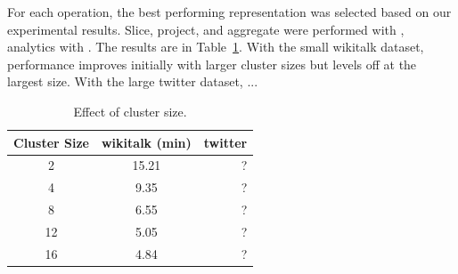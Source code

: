For each operation, the best performing representation was selected
based on our experimental results.  Slice, project, and aggregate were
performed with \ve, analytics with \hg.  The results are in
Table~\ref{tab:clustersize}.  With the small wikitalk dataset,
performance improves initially with larger cluster sizes but levels
off at the largest size.  With the large twitter dataset, ...

\begin{table}
\caption{Effect of cluster size.}
\small
\begin{tabular}{| c | c | r |}
\hline
\multicolumn{1}{|c|}{\bfseries Cluster Size} & \multicolumn{1}{c|}{\bfseries wikitalk (min)} & \multicolumn{1}{r|}{\bfseries twitter} \\ \hline
2 & 15.21 & ? \\ \hline
4 & 9.35 & ? \\ \hline
8 & 6.55 & ? \\ \hline
12 & 5.05 & ? \\ \hline
16 & 4.84 & ? \\ \hline
\end{tabular}
\label{tab:clustersize}
\end{table}

